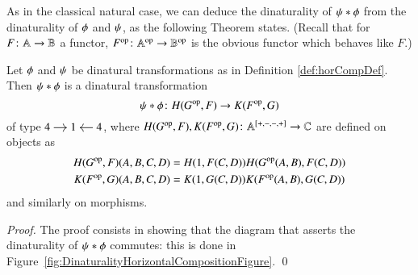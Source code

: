 As in the classical natural case, we can deduce the dinaturality of $\hc \fst \snd$ from the dinaturality of $\fst$ and $\psi$, as the following Theorem states. (Recall that for $F \colon \mathbb A \to \mathbb B$ a functor, $F^{\text{op}} \colon \mathbb A^{\text{op}} \to \mathbb B^{\text{op}}$ is the obvious functor which behaves like $F$.)

\begin{theorem}\label{thm:horCompTheorem}
	Let $\fst$ and $\psi$ be dinatural transformations as in Definition \ref{def:horCompDef}. Then $\hc \fst \snd$ is a dinatural transformation
	\[
	\hc \fst \snd \colon \sndDom(\Op\fstCoDom , \fstDom) \to \sndCoDom(\Op\fstDom,\fstCoDom)
	\]
	of type 
	$
	\begin{tikzcd}[cramped,sep=small]
	4 \ar[r] & 1 & 4 \ar[l]
	\end{tikzcd}
	$, where $H(G^{\text{op}} , F), K(F^{\text{op}},G) \colon \mathbb A^{[+,-,-,+]} \to \mathbb C$ are defined on objects as
	\begin{align*}
	\sndDom(\Op\fstCoDom , \fstDom)(A,B,C,D) &= \hcd A B C D \\
	\sndCoDom(\Op\fstDom,\fstCoDom)(A,B,C,D) &= \hcc A B C D
	\end{align*}
	and similarly on morphisms.
\end{theorem}
\begin{proof}
	The proof consists in showing that the diagram that asserts the dinaturality of $\hc \fst \snd$ commutes: this is done in Figure~\ref{fig:DinaturalityHorizontalCompositionFigure}. \qed
\end{proof}

